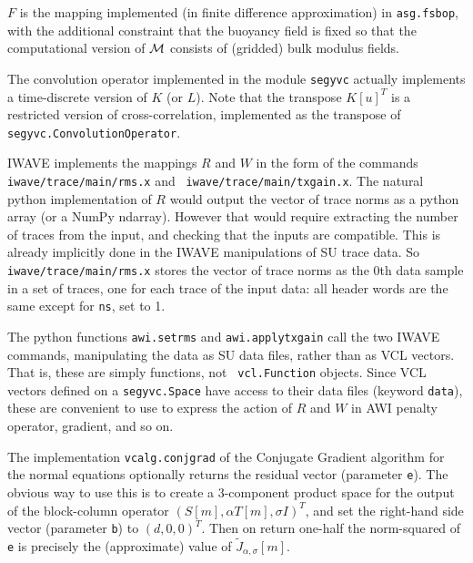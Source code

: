  $F$ is the mapping implemented (in finite difference approximation) in {\tt asg.fsbop}, with the additional constraint that the buoyancy field is fixed so that the computational version of ${\cal M}$ consists of (gridded) bulk modulus fields.

 The convolution operator implemented in the module {\tt segyvc}
actually implements a time-discrete version of $K$ (or $L$). Note that
the transpose $K[u]^T$ is a restricted version of cross-correlation,
implemented as the transpose of {\tt segyvc.ConvolutionOperator}.

 IWAVE implements the mappings $R$ and $W$ in the form of
the commands \\{\tt iwave/trace/main/rms.x} and {\tt
  iwave/trace/main/txgain.x}. The natural python implementation of $R$
would output the vector of trace norms as a python array (or a NumPy
ndarray). However that would require extracting the number of traces
from the input, and checking that the inputs are compatible. This is
already implicitly done in the IWAVE manipulations of SU trace
data. So {\tt iwave/trace/main/rms.x} stores the vector of trace norms
as the 0th data sample in a set of traces, one for each trace of the
input data: all header words are the same except for {\tt ns}, set to 1.

 The python functions {\tt awi.setrms} and {\tt awi.applytxgain} call
the two IWAVE commands, manipulating the data as SU data files, rather
than as VCL vectors. That is, these are simply functions, not {\tt
  vcl.Function} objects. Since VCL vectors defined on a {\tt segyvc.Space}
have access to their data files (keyword {\tt data}), these are
convenient to use to express the action of $R$ and $W$ in AWI penalty operator,
gradient, and so on.

 The implementation {\tt vcalg.conjgrad} of the Conjugate Gradient algorithm for the normal equations optionally returns the residual vector (parameter {\tt e}). The obvious way to use this is to create a 3-component product space for the output of the block-column operator $(S[m],\alpha T[m], \sigma I)^T$, and set the right-hand side vector (parameter {\tt b})
to $(d,0,0)^T$. Then on return one-half the norm-squared of {\tt e} is precisely the (approximate) value of $\tilde{J}_{\alpha,\sigma}[m]$.


